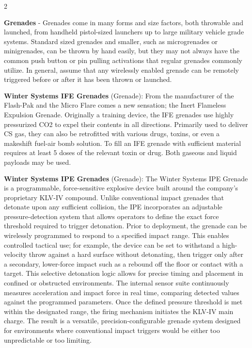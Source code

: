\documentclass[
  oneside]{article}
\begin{document}
\begin{multicols}{2}

\textbf{Grenades} - Grenades come in many forms
and size factors, both throwable and launched,
from handheld pistol-sized launchers up to large
military vehicle grade systems. Standard sized
grenades and smaller, such as microgrenades or
minigrenades, can be thrown by hand easily, but
they may not always have the common push button or
pin pulling activations that regular grenades
commonly utilize. In general, assume that any
wirelessly enabled grenade can be remotely
triggered before or after it has been thrown or
launched.

\textbf{Winter Systems IFE Grenades} (Grenade):
From the manufacturer of the Flash-Pak and the
Micro Flare comes a new sensation; the Inert
Flameless Expulsion Grenade. Originally a training
device, the IFE grenades use highly pressurized
CO2 to expel their contents in all directions.
Primarily used to deliver CS gas, they can also be
retrofitted with various drugs, toxins, or even a
makeshift fuel-air bomb solution. To fill an IFE
grenade with sufficient material requires at least
5 doses of the relevant toxin or drug. Both
gaseous and liquid payloads may be used.

\textbf{Winter Systems IPE Grenades} (Grenade):
The Winter Systems IPE Grenade is a programmable,
force-sensitive explosive device built around the
company's proprietary KLV-IV compound. Unlike
conventional impact grenades that detonate upon
any sufficient collision, the IPE incorporates an
adjustable pressure-detection system that allows
operators to define the exact force threshold
required to trigger detonation. Prior to
deployment, the grenade can be wirelessly
programmed to respond to a specified impact range.
This enables controlled tactical use; for example,
the device can be set to withstand a high-velocity
throw against a hard surface without detonating,
then trigger only after a secondary, lower-force
impact such as a rebound off the floor or contact
with a target. This selective detonation logic
allows for precise timing and placement in
confined or obstructed environments. The internal
sensor suite continuously measures acceleration
and impact force in real time, comparing detected
values against the programmed parameters. Once the
defined pressure threshold is met within the
designated range, the firing mechanism initiates
the KLV-IV main charge. The result is a versatile,
precision-configurable grenade system designed for
environments where conventional impact triggers
would be either too unpredictable or too limiting.

\end{multicols}
\end{document}
